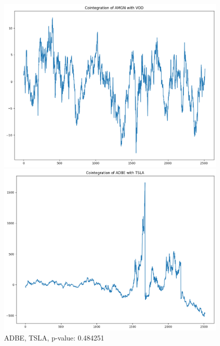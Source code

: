 \documentclass{article}
\begin{document}
\begin{spacing}{2.0}
\begin{figure}[h!]
    \centering
    \begin{minipage}{0.48\textwidth}
        \centering
        \includegraphics[width=\textwidth]{./images/amgn_vod_cointegration.png}
        \caption{AMGN, VOD, p-value: 0.000181}
    \end{minipage}
    \hfill
    \begin{minipage}{0.48\textwidth}
        \centering
        \includegraphics[width=\textwidth]{./images/adbe_tsla_cointegration.png}
        \caption{ADBE, TSLA, p-value: 0.484251}
    \end{minipage}
\end{figure}


\end{spacing}
\end{document}
